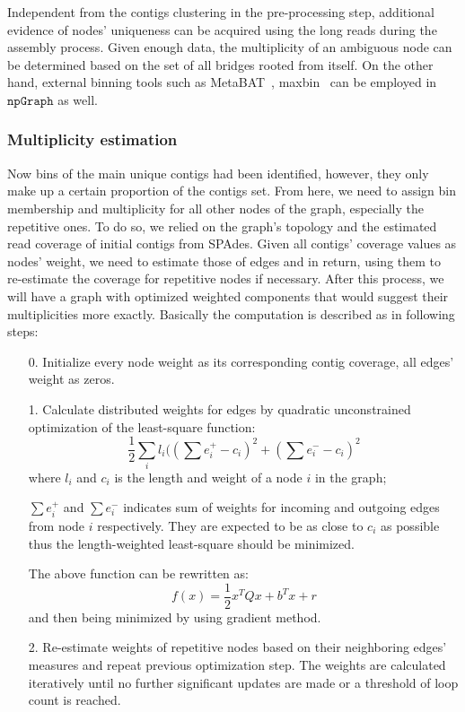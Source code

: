 \documentclass[10pt,letterpaper]{article}
\newcommand{\npgraph}{$\mathtt{npGraph}$}
\begin{document}
Independent from the contigs clustering in the pre-processing step, additional evidence of nodes' uniqueness can be acquired using the long reads during the assembly process. Given enough data, the multiplicity of an ambiguous node can be determined based on the set of all bridges rooted from itself.
On the other hand, external binning tools such as MetaBAT~\cite{Kang2015metabat}, maxbin~\cite{Wu2014maxbin} can be employed in \npgraph{} as well.

\subsubsection*{Multiplicity estimation}
Now bins of the main unique contigs had been identified, however, they only make up a certain proportion of the contigs set. From here, we need to assign bin membership and multiplicity for all other nodes of the graph, especially the repetitive ones. To do so, we relied on the graph's topology and the estimated read coverage of initial contigs from SPAdes.
Given all contigs' coverage values as nodes' weight, we need to estimate those of edges and in return, using them to re-estimate the coverage for repetitive nodes if necessary. After this process, we will have a graph with optimized weighted components that would suggest their multiplicities more exactly. Basically the computation is described as in following steps:

\begin{itemize}
\item[0.] Initialize every node weight as its corresponding contig coverage, all edges' weight as zeros.
\item[1.] Calculate distributed weights for edges by quadratic unconstrained optimization of the least-square function:
$$\frac{1}{2}\sum_{i}{l_i((\sum{e^{+}_{i}}-c_i)^2+(\sum{e^{-}_{i}}-c_i)^2}$$
where $l_i$ and $c_i$ is the length and weight of a node $i$ in the graph;

$\sum{e^{+}_{i}}$ and $\sum{e^{-}_{i}}$ indicates sum of weights for incoming and outgoing edges from node $i$ respectively. They are expected to be as close to $c_i$ as possible thus the length-weighted least-square should be minimized. 

The above function can be rewritten as:
$$f(x)=\frac{1}{2}x^TQx + b^Tx + r$$
and then being minimized by using gradient method.
\item[2.] Re-estimate weights of repetitive nodes based on their neighboring edges' measures and repeat previous optimization step. 
The weights are calculated iteratively until no further significant updates are made or a threshold of loop count is reached.
\end{itemize}
\end{document}
